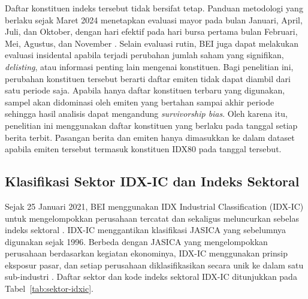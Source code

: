 Daftar konstituen indeks tersebut tidak bersifat tetap. Panduan metodologi yang berlaku sejak Maret 2024 menetapkan evaluasi mayor pada bulan Januari, April, Juli, dan Oktober, dengan hari efektif pada hari bursa pertama bulan Februari, Mei, Agustus, dan November \autocite{idx2024metodologi}. Selain evaluasi rutin, BEI juga dapat melakukan evaluasi insidental apabila terjadi perubahan jumlah saham yang signifikan, \emph{delisting}, atau informasi penting lain mengenai konstituen. Bagi penelitian ini, perubahan konstituen tersebut berarti daftar emiten tidak dapat diambil dari satu periode saja. Apabila hanya daftar konstituen terbaru yang digunakan, sampel akan didominasi oleh emiten yang bertahan sampai akhir periode sehingga hasil analisis dapat mengandung \emph{survivorship bias}. Oleh karena itu, penelitian ini menggunakan daftar konstituen yang berlaku pada tanggal setiap berita terbit. Pasangan berita dan emiten hanya dimasukkan ke dalam dataset apabila emiten tersebut termasuk konstituen IDX80 pada tanggal tersebut.

\subsection{Klasifikasi Sektor IDX-IC dan Indeks Sektoral}

Sejak 25 Januari 2021, BEI menggunakan IDX Industrial Classification (IDX-IC) untuk mengelompokkan perusahaan tercatat dan sekaligus meluncurkan sebelas indeks sektoral \autocite{cnbc2021idxic}. IDX-IC menggantikan klasifikasi JASICA yang sebelumnya digunakan sejak 1996. Berbeda dengan JASICA yang mengelompokkan perusahaan berdasarkan kegiatan ekonominya, IDX-IC menggunakan prinsip eksposur pasar, dan setiap perusahaan diklasifikasikan secara unik ke dalam satu sub-industri \autocite{kontan2021idxic}. Daftar sektor dan kode indeks sektoral IDX-IC ditunjukkan pada Tabel~\ref{tab:sektor-idxic}.


